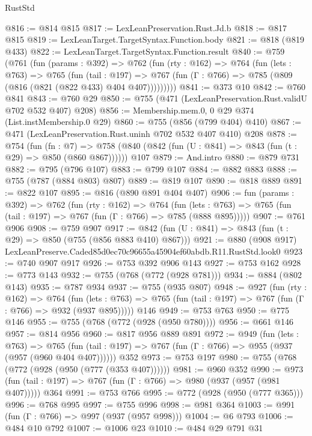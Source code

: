 \begin{lexlean}{RustStd}
\begin{coremodule}
@816 := @814 @815
@817 := LexLeanPreservation.Rust.Jd.b
@818 := @817 @815
@819 := LexLeanTarget.TargetSyntax.Function.body
@821 := @818 (@819 @433)
@822 := LexLeanTarget.TargetSyntax.Function.result
@840 := @759
    (@761
      (fun (params : @392) =>
      @762
        (fun (rty : @162) =>
        @764
          (fun (lets : @763) =>
          @765
            (fun (tail : @197) =>
            @767 (fun (Γ : @766) => @785 (@809 (@816 (@821 (@822 @433) @404 @407)))))))))
@841 := @373 @10
@842 := @760 @841
@843 := @760 @29
@850 := @755 (@471 (LexLeanPreservation.Rust.validU @702 @532 @407) @208)
@856 := Membership.mem.{0, 0} @29 @374 (List.instMembership.{0} @29)
@860 := @755 (@856 (@799 @404) @410)
@867 := @471 (LexLeanPreservation.Rust.uninh @702 @532 @407 @410) @208
@878 := @754
    (fun (fn : @7) =>
    @758 (@840 (@842 (fun (U : @841) => @843 (fun (t : @29) => @850 (@860 @867))))))
    @107
@879 := And.intro
@880 := @879 @731
@882 := @795 (@796 @107)
@883 := @799 @107
@884 := @882 @883
@888 := @755 (@787 (@884 @803) @807)
@889 := @819 @107
@890 := @818 @889
@891 := @822 @107
@895 := @816 (@890 @891 @404 @407)
@906 := fun (params : @392) =>
  @762
    (fun (rty : @162) =>
    @764
      (fun (lets : @763) => @765 (fun (tail : @197) => @767 (fun (Γ : @766) => @785 (@888 @895)))))
@907 := @761 @906
@908 := @759 @907
@917 := @842 (fun (U : @841) => @843 (fun (t : @29) => @850 (@755 (@856 @883 @410) @867)))
@921 := @880 (@908 @917) LexLeanPreserve.Caded85d0ec70c96655a45904ef60abdb.R11.RustStd.look0
@923 := @740 @907 @917
@926 := @753 @392 @906 @143
@927 := @753 @162
@928 := @773 @143
@932 := @755 (@768 (@772 (@928 @781)))
@934 := @884 (@802 @143)
@935 := @787 @934
@937 := @755 (@935 @807)
@948 := @927
    (fun (rty : @162) =>
    @764
      (fun (lets : @763) => @765 (fun (tail : @197) => @767 (fun (Γ : @766) => @932 (@937 @895)))))
    @146
@949 := @753 @763
@950 := @775 @146
@955 := @755 (@768 (@772 (@928 (@950 @780))))
@956 := @661 @146
@957 := @814 @956
@960 := @817 @956 @889 @891
@972 := @949
    (fun (lets : @763) =>
    @765 (fun (tail : @197) => @767 (fun (Γ : @766) => @955 (@937 (@957 (@960 @404 @407))))))
    @352
@973 := @753 @197
@980 := @755 (@768 (@772 (@928 (@950 (@777 (@353 @407))))))
@981 := @960 @352
@990 := @973 (fun (tail : @197) => @767 (fun (Γ : @766) => @980 (@937 (@957 (@981 @407))))) @364
@991 := @753 @766
@995 := @772 (@928 (@950 (@777 @365)))
@996 := @768 @995
@997 := @755 @996
@998 := @981 @364
@1003 := @991 (fun (Γ : @766) => @997 (@937 (@957 @998)))
@1004 := @6 @793
@1006 := @484 @10 @792
@1007 := @1006 @23
@1010 := @484 @29 @791 @31

\end{coremodule}
\end{lexlean}
